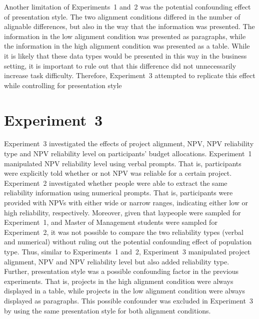 \documentclass[
  english,
  man, donotrepeattitle,floatsintext]{apa7}
\theoremstyle{definition}
\theoremstyle{definition}
\theoremstyle{definition}
\theoremstyle{definition}
\theoremstyle{remark}
\begin{document}
Another limitation of Experiments~1 and~2 was the potential confounding effect
of presentation style. The two alignment conditions differed in the number of
alignable differences, but also in the way that the information was presented.
The information in the low alignment condition was presented as paragraphs,
while the information in the high alignment condition was presented as a table.
While it is likely that these data types would be presented in this way in the
business setting, it is important to rule out that this difference did not
unnecessarily increase task difficulty. Therefore, Experiment~3 attempted to
replicate this effect while controlling for presentation style

\hypertarget{alignment-8}{%
\section{Experiment~3}\label{alignment-8}}

Experiment~3 investigated the effects of project alignment, NPV, NPV reliability
type and NPV reliability level on participants' budget allocations. Experiment~1
manipulated NPV reliability level using verbal prompts. That is, participants
were explicitly told whether or not NPV was reliable for a certain project.
Experiment~2 investigated whether people were able to extract the same
reliability information using numerical prompts. That is, participants were
provided with NPVs with either wide or narrow ranges, indicating either low or
high reliability, respectively. Moreover, given that laypeople were sampled for
Experiment~1, and Master of Management students were sampled for Experiment~2,
it was not possible to compare the two reliability types (verbal and numerical)
without ruling out the potential confounding effect of population type. Thus,
similar to Experiments~1 and~2, Experiment~3 manipulated project alignment, NPV
and NPV reliability level but also added reliability type. Further, presentation
style was a possible confounding factor in the previous experiments. That is,
projects in the high alignment condition were always displayed in a table, while
projects in the low alignment condition were always displayed as paragraphs.
This possible confounder was excluded in Experiment~3 by using the same
presentation style for both alignment conditions.
\end{document}
